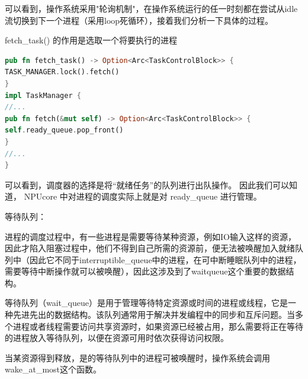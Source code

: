 可以看到，操作系统采⽤"轮询机制"，在操作系统运⾏的任⼀时刻都在尝试从idle流切换到下一个进程（采用loop死循环），接着我们分析⼀下具体的过程。

fetch_task() 的作用是选取⼀个将要执⾏的进程 

\begin{lstlisting}[language=rust]
    pub fn fetch_task() -> Option<Arc<TaskControlBlock>> { 
TASK_MANAGER.lock().fetch() 
}
impl TaskManager { 
//... 
pub fn fetch(&mut self) -> Option<Arc<TaskControlBlock>> { 
self.ready_queue.pop_front() 
} 
//... 
} 
\end{lstlisting}

可以看到，调度器的选择是将“就绪任务”的队列进⾏出队操作。
因此我们可以知道， NPUcore 中对进程的调度实际上就是对 ready_queue 进行管理。 

等待队列：

进程的调度过程中，有一些进程是需要等待某种资源，例如IO输入这样的资源，因此才陷入阻塞过程中，他们不得到自己所需的资源前，便无法被唤醒加入就绪队列中（因此它不同于interruptible_queue中的进程，在可中断睡眠队列中的进程，需要等待中断操作就可以被唤醒），因此这涉及到了waitqueue这个重要的数据结构。

等待队列（wait_queue）是用于管理等待特定资源或时间的进程或线程，它是一种先进先出的数据结构。该队列通常用于解决并发编程中的同步和互斥问题。当多个进程或者线程需要访问共享资源时，如果资源已经被占用，那么需要将正在等待的进程放入等待队列，以便在资源可用时依次获得访问权限。

当某资源得到释放，是的等待队列中的进程可被唤醒时，操作系统会调用wake_at_most这个函数。

